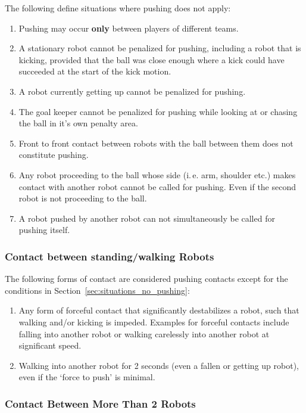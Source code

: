 \documentclass[12pt]{article}
\newcommand{\ie}{\mbox{i.\,e.}\xspace}
\begin{document}
The following define situations where pushing does not apply:

\begin{enumerate}
	\item Pushing may occur \textbf{only} between players of different teams.
	\item A stationary robot cannot be penalized for pushing, including a robot that is kicking, provided that the ball was close enough where a kick could have succeeded at the start of the kick motion.
	\item A robot currently getting up cannot be penalized for pushing.
	\item The goal keeper cannot be penalized for pushing while looking at or chasing the ball in it's own penalty area.
	\item Front to front contact between robots with the ball between them does not constitute pushing.
	\item Any robot proceeding to the ball whose side (\ie arm, shoulder etc.) makes contact with another robot cannot be called for pushing. Even if the second robot is not proceeding to the ball.
	\item A robot pushed by another robot can not simultaneously be called for pushing itself.
\end{enumerate}

\subsubsection{Contact between standing/walking Robots}
\label{sec:pushing_contact}

The following forms of contact are considered pushing contacts except for the conditions in Section~\ref{sec:situations_no_pushing}:
\begin{enumerate}
	\item Any form of forceful contact that significantly destabilizes a robot, such that walking and/or kicking is impeded. Examples for forceful contacts include falling into another robot or walking carelessly into another robot at significant speed.
	\item Walking into another robot for 2 seconds (even a fallen or getting up robot), even if the `force to push' is minimal.
\end{enumerate}

\subsubsection{Contact Between More Than 2 Robots}
\label{sec:pushing_several_robots}
\end{document}
